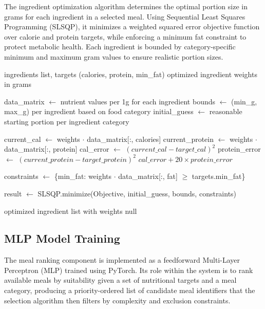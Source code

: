 The ingredient optimization algorithm determines the optimal portion size in grams for 
each ingredient in a selected meal. Using Sequential Least Squares Programming (SLSQP), 
it minimizes a weighted squared error objective function over calorie and protein 
targets, while enforcing a minimum fat constraint to protect metabolic health. Each 
ingredient is bounded by category-specific minimum and maximum gram values to ensure 
realistic portion sizes.

\clearpage
\begin{algorithm}
\caption{Ingredient Weight Optimization via SLSQP}
\begin{algorithmic}[1]
\Require ingredients list, targets (calories, protein, min\_fat)
\Ensure optimized ingredient weights in grams

\State data\_matrix $\gets$ nutrient values per 1g for each ingredient
\State bounds $\gets$ (min\_g, max\_g) per ingredient based on food category
\State initial\_guess $\gets$ reasonable starting portion per ingredient category

    \State current\_cal $\gets$ weights $\cdot$ data\_matrix[:, calories]
    \State current\_protein $\gets$ weights $\cdot$ data\_matrix[:, protein]
    \State cal\_error $\gets$ $(current\_cal - target\_cal)^2$
    \State protein\_error $\gets$ $(current\_protein - target\_protein)^2$
    \State \Return $cal\_error + 20 \times protein\_error$ 
\EndFunction

\State constraints $\gets$ \{min\_fat: weights $\cdot$ data\_matrix[:, fat] $\geq$ targets.min\_fat\}

\State result $\gets$ SLSQP.minimize(Objective, initial\_guess, bounds, constraints)

    \State \Return optimized ingredient list with weights
\Else
    \State \Return null
\EndIf

\end{algorithmic}
\end{algorithm}

\subsection{MLP Model Training}

The meal ranking component is implemented as a feedforward Multi-Layer Perceptron (MLP)
trained using PyTorch. Its role within the system is to rank available meals by
suitability given a set of nutritional targets and a meal category, producing a
priority-ordered list of candidate meal identifiers that the selection algorithm
then filters by complexity and exclusion constraints.

